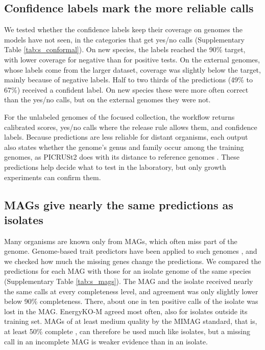 \documentclass[10pt,a4paper,onecolumn]{article}
\begin{document}
\subsection{Confidence labels mark the more reliable
calls}\label{confidence-labels-mark-the-more-reliable-calls}

We tested whether the confidence labels keep their coverage on genomes
the models have not seen, in the categories that get yes/no calls
(Supplementary Table \ref{tab:s_conformal}). On new species, the labels
reached the 90\% target, with lower coverage for negative than for
positive tests. On the external genomes, whose labels come from the
larger dataset, coverage was slightly below the target, mainly because
of negative labels. Half to two thirds of the predictions (49\% to 67\%)
received a confident label. On new species these were more often correct
than the yes/no calls, but on the external genomes they were not.

For the unlabeled genomes of the focused collection, the workflow
returns calibrated scores, yes/no calls where the release rule allows
them, and confidence labels. Because predictions are less reliable for
distant organisms, each output also states whether the genome's genus
and family occur among the training genomes, as PICRUSt2 does with its
distance to reference genomes \autocite{Douglas2020}. These predictions
help decide what to test in the laboratory, but only growth experiments
can confirm them.

\subsection{MAGs give nearly the same predictions as
isolates}\label{mags-give-nearly-the-same-predictions-as-isolates}

Many organisms are known only from MAGs, which often miss part of the
genome. Genome-based trait predictors have been applied to such genomes
\autocite{Weimann2016,Weissman2021}, and we checked how much the missing
genes change the predictions. We compared the predictions for each MAG
with those for an isolate genome of the same species (Supplementary
Table \ref{tab:s_mags}). The MAG and the isolate received nearly the
same calls at every completeness level, and agreement was only slightly
lower below 90\% completeness. There, about one in ten positive calls of
the isolate was lost in the MAG. EnergyKO-M agreed most often, also for
isolates outside its training set. MAGs of at least medium quality by
the MIMAG standard, that is, at least 50\% complete
\autocite{Bowers2017}, can therefore be used much like isolates, but a
missing call in an incomplete MAG is weaker evidence than in an isolate.
\end{document}
